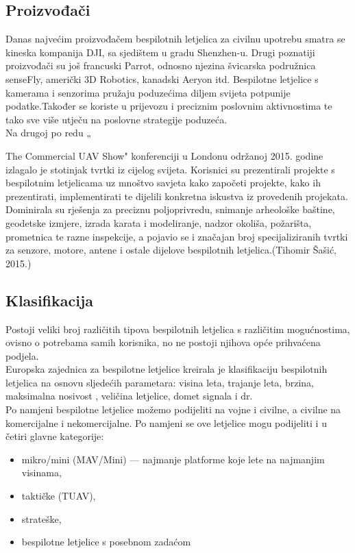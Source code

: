 \documentclass[times, utf8, diplomski]{fer}
\begin{document}
\subsection{Proizvođači}
Danas  najvećim  proizvođačem  bespilotnih  letjelica  za  civilnu  upotrebu  smatra  se kineska kompanija DJI, sa sjedištem u gradu Shenzhen-u. Drugi poznatiji proizvođači su još francuski  Parrot,  odnosno njezina  švicarska  podružnica  senseFly,  američki  3D  Robotics,  kanadski  Aeryon itd.
Bespilotne letjelice  s  kamerama  i  senzorima pružaju poduzećima  diljem  svijeta potpunije podatke.Također se koriste u prijevozu i preciznim poslovnim aktivnostima te tako sve više utječu na poslovne strategije poduzeća.\\
Na  drugoj  po  redu  „{The  Commercial  UAV  Show"  konferenciji  u  Londonu održanoj 2015. godine izlagalo je  stotinjak tvrtki iz cijelog svijeta. Korisnici su prezentirali projekte s bespilotnim  letjelicama  uz  mnoštvo  savjeta  kako  započeti  projekte,  kako  ih  prezentirati, implementirati te dijelili konkretna iskustva iz provedenih projekata. Dominirala su rješenja za preciznu  poljoprivredu,  snimanje  arheološke  baštine,  geodetske  izmjere,  izrada  karata  i modeliranje, nadzor okoliša, požarišta, prometnica te razne inspekcije, a pojavio se i značajan broj  specijaliziranih  tvrtki  za  senzore,  motore,  antene  i  ostale  dijelove  bespilotnih  letjelica.(Tihomir Šašić, 2015.)

\subsection{Klasifikacija}
Postoji  veliki  broj  različitih  tipova  bespilotnih  letjelica  s  različitim  mogućnostima, ovisno o potrebama samih korisnika, no ne postoji njihova opće prihvaćena podjela.\\
Europska  zajednica  za  bespilotne  letjelice   kreirala je klasifikaciju bespilotnih letjelica na osnovu sljedećih parametara:  visina  leta,  trajanje  leta,  brzina,  maksimalna  nosivost  , veličina letjelice, domet signala i dr. \\
Po  namjeni  bespilotne  letjelice
možemo  podijeliti  na  vojne  i  civilne,  a  civilne  na komercijalne i nekomercijalne. Po namjeni se ove letjelice mogu podijeliti i u četiri glavne kategorije:\begin{itemize}
\item mikro/mini (MAV/Mini) --- najmanje platforme koje lete na najmanjim visinama,
\item taktičke (TUAV),
\item strateške,
\item bespilotne letjelice s posebnom zadaćom
\end{itemize}

}
\end{document}

